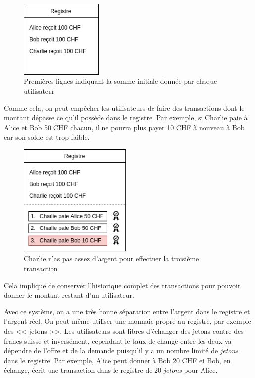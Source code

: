 \begin{figure}[H]
  \centering
  \includegraphics[width=4cm]{images/crypto_6.png}
  \caption{Premières lignes indiquant la somme initiale donnée par chaque utilisateur}
\end{figure}

Comme cela, on peut empêcher les utilisateurs de faire des transactions dont le montant dépasse ce qu'il possède dans le registre. Par exemple, si Charlie paie à Alice et Bob 50 CHF chacun, il ne pourra plus payer 10 CHF à nouveau à Bob car son solde est trop faible.

\begin{figure}[H]
  \centering
  \includegraphics[width=5.5cm]{images/crypto_7.png}
  \caption{Charlie n'as pas assez d'argent pour effectuer la troisième transaction}
\end{figure}

Cela implique de conserver l'historique complet des transactions pour pouvoir donner le montant restant d'un utilisateur.

Avec ce système, on a une très bonne séparation entre l'argent dans le registre et l'argent réel. On peut même utiliser une monnaie propre au registre, par exemple des << jetons >>. Les utilisateurs sont libres d'échanger des jetons contre des francs suisse et inversément, cependant le taux de change entre les deux va dépendre de l'offre et de la demande puisqu'il y a un nombre limité de \emph{jetons} dans le registre. Par exemple, Alice peut donner à Bob 20 CHF et Bob, en échange, écrit une transaction dans le registre de 20 \emph{jetons} pour Alice.


